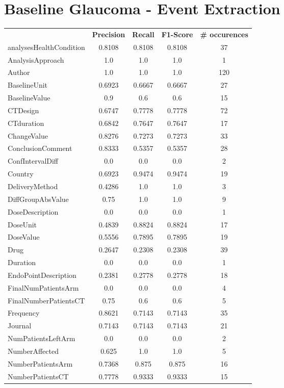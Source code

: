 \section{Baseline Glaucoma - Event Extraction}
\begin{longtable}{ l c c c c}
 & \textbf{Precision} & \textbf{Recall} & \textbf{F1-Score} & \textbf{\# occurences} \\ \cline{1-5}
analysesHealthCondition & 0.8108 & 0.8108 & 0.8108 & 37\\
AnalysisApproach & 1.0 & 1.0 & 1.0 & 1\\
Author & 1.0 & 1.0 & 1.0 & 120\\
BaselineUnit & 0.6923 & 0.6667 & 0.6667 & 27\\
BaselineValue & 0.9 & 0.6 & 0.6 & 15\\
CTDesign & 0.6747 & 0.7778 & 0.7778 & 72\\
CTduration & 0.6842 & 0.7647 & 0.7647 & 17\\
ChangeValue & 0.8276 & 0.7273 & 0.7273 & 33\\
ConclusionComment & 0.8333 & 0.5357 & 0.5357 & 28\\
ConfIntervalDiff & 0.0 & 0.0 & 0.0 & 2\\
Country & 0.6923 & 0.9474 & 0.9474 & 19\\
DeliveryMethod & 0.4286 & 1.0 & 1.0 & 3\\
DiffGroupAbsValue & 0.75 & 1.0 & 1.0 & 9\\
DoseDescription & 0.0 & 0.0 & 0.0 & 1\\
DoseUnit & 0.4839 & 0.8824 & 0.8824 & 17\\
DoseValue & 0.5556 & 0.7895 & 0.7895 & 19\\
Drug & 0.2647 & 0.2308 & 0.2308 & 39\\
Duration & 0.0 & 0.0 & 0.0 & 1\\
EndoPointDescription & 0.2381 & 0.2778 & 0.2778 & 18\\
FinalNumPatientsArm & 0.0 & 0.0 & 0.0 & 4\\
FinalNumberPatientsCT & 0.75 & 0.6 & 0.6 & 5\\
Frequency & 0.8621 & 0.7143 & 0.7143 & 35\\
Journal & 0.7143 & 0.7143 & 0.7143 & 21\\
NumPatientsLeftArm & 0.0 & 0.0 & 0.0 & 2\\
NumberAffected & 0.625 & 1.0 & 1.0 & 5\\
NumberPatientsArm & 0.7368 & 0.875 & 0.875 & 16\\
NumberPatientsCT & 0.7778 & 0.9333 & 0.9333 & 15\\

\end{longtable}
